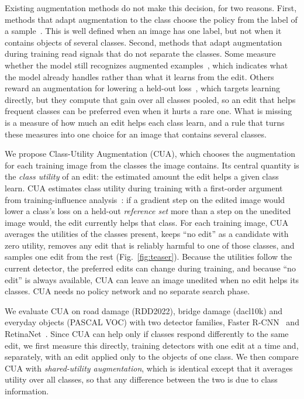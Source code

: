 Existing augmentation methods do not make this decision, for two reasons. First, methods that adapt augmentation to the class choose the policy from the label of a sample~\cite{yoo2023,cheung2022adaaug,ahn2023cuda}. This is well defined when an image has one label, but not when it contains objects of several classes. Second, methods that adapt augmentation during training read signals that do not separate the classes. Some measure whether the model still recognizes augmented examples~\cite{berthelot2020,ahn2023cuda}, which indicates what the model already handles rather than what it learns from the edit. Others reward an augmentation for lowering a held-out loss~\cite{lu2023bda,liu2021ddas,hou2023madaug}, which targets learning directly, but they compute that gain over all classes pooled, so an edit that helps frequent classes can be preferred even when it hurts a rare one. What is missing is a measure of how much an edit helps each class learn, and a rule that turns these measures into one choice for an image that contains several classes.

We propose Class-Utility Augmentation (CUA), which chooses the augmentation for each training image from the classes the image contains. Its central quantity is the \emph{class utility} of an edit: the estimated amount the edit helps a given class learn. CUA estimates class utility during training with a first-order argument from training-influence analysis~\cite{pruthi2020tracin}: if a gradient step on the edited image would lower a class's loss on a held-out \emph{reference set} more than a step on the unedited image would, the edit currently helps that class. For each training image, CUA averages the utilities of the classes present, keeps ``no edit'' as a candidate with zero utility, removes any edit that is reliably harmful to one of those classes, and samples one edit from the rest (Fig.~\ref{fig:teaser}). Because the utilities follow the current detector, the preferred edits can change during training, and because ``no edit'' is always available, CUA can leave an image unedited when no edit helps its classes. CUA needs no policy network and no separate search phase.

We evaluate CUA on road damage (RDD2022), bridge damage (dacl10k) and everyday objects (PASCAL VOC) with two detector families, Faster R-CNN~\cite{ren2017faster} and RetinaNet~\cite{lin2017focal}. Since CUA can help only if classes respond differently to the same edit, we first measure this directly, training detectors with one edit at a time and, separately, with an edit applied only to the objects of one class. We then compare CUA with \emph{shared-utility augmentation}, which is identical except that it averages utility over all classes, so that any difference between the two is due to class information. 

